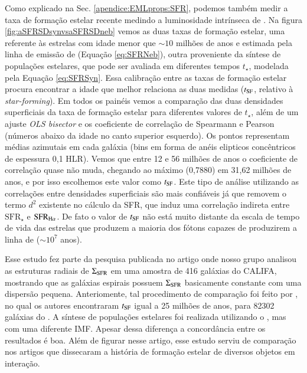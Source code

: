 Como explicado na Sec. \ref{apendice:EMLprops:SFR}, podemos também medir a taxa de formação estelar recente medindo a luminosidade intrínseca de \Ha. Na figura \ref{fig:aSFRSDsynvsaSFRSDneb} vemos as duas taxas de formação estelar, uma referente às estrelas com idade menor que $\sim 10$ milhões de anos e estimada pela linha de emissão de \Ha (Equação \ref{eq:SFRNeb}), outra proveniente da síntese de populações estelares, que pode ser avaliada em diferentes tempos $t_\star$, modelada pela Equação \ref{eq:SFRSyn}. Essa calibração entre as taxas de formação estelar procura encontrar a idade que melhor relaciona as duas medidas ($t_{\rm SF}$, relativo à {\em star-forming}). Em todos os painéis vemos a comparação das duas densidades superficiais da taxa de formação estelar para diferentes valores de $t_\star$, além de um ajuste {\em OLS bisector} e os coeficiente de correlação de Spearmann e Pearson (números abaixo da idade no canto superior esquerdo). Os pontos representam médias azimutais em cada galáxia (bins em forma de anéis elipticos concêntricos de espessura 0,1 HLR). Vemos que entre 12 e 56 milhões de anos o coeficiente de correlação quase não muda, chegando ao máximo (0,7880) em 31,62 milhões de anos, e por isso escolhemos este valor como $t_{\rm SF}$. Este tipo de análise utilizando as correlações entre densidades superficiais são mais confiáveis já que removem o termo $d^2$ existente no cálculo da SFR, que induz uma correlação indireta entre $\mathrm{SFR}_\star$ e $\mathrm{SFR}_{\Ha}$. De fato o valor de $t_{\rm SF}$ não está muito distante da escala de tempo de vida das estrelas que produzem a maioria dos fótons capazes de produzirem a linha de \Ha ($\sim10^7$ anos).

Esse estudo fez parte da pesquisa publicada no artigo \citep{GonzalezDelgado.etal.2016a} onde nosso grupo analisou as estruturas radiais de $\Sigma_{\rm SFR}$ em uma amostra de 416 galáxias do CALIFA, mostrando que as galáxias espirais possuem $\Sigma_{\rm SFR}$ basicamente constante com uma dispersão pequena. Anteriomente, tal procedimento de comparação foi feito por \citet{Asari.etal.2007a}, no qual os autores encontraram $t_{\rm SF}$ igual a 25 milhões de anos, para 82302 galáxias do \SDSS. A síntese de populações estelares foi realizada utilizando o \starlight, mas com uma diferente IMF. Apesar dessa diferença a concordância entre os resultados é boa. Além de figurar nesse artigo, esse estudo serviu de comparação nos artigos \citet{CortijoFerrero.etal.2017a, CortijoFerrero.etal.2017b, CortijoFerrero.etal.2017c} que dissecaram a história de formação estelar de diversos objetos em interação.

